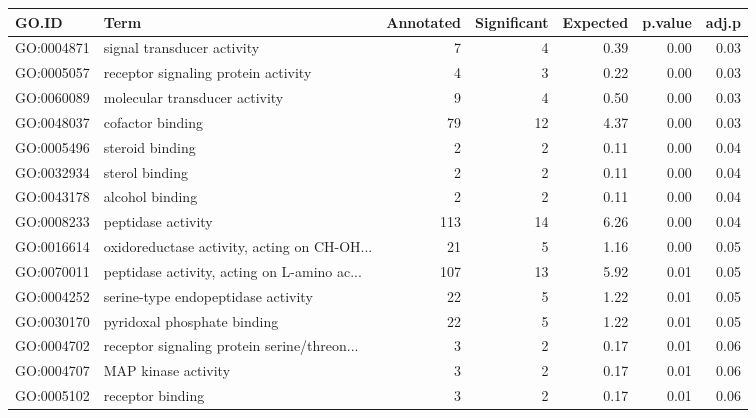 \begin{table}[ht]
\centering
\begin{tabular}{llrrrrr}
  \hline
GO.ID & Term & Annotated & Significant & Expected & p.value & adj.p \\ 
  \hline
GO:0004871 & signal transducer activity &   7 &   4 & 0.39 & 0.00 & 0.03 \\ 
  GO:0005057 & receptor signaling protein activity &   4 &   3 & 0.22 & 0.00 & 0.03 \\ 
  GO:0060089 & molecular transducer activity &   9 &   4 & 0.50 & 0.00 & 0.03 \\ 
  GO:0048037 & cofactor binding &  79 &  12 & 4.37 & 0.00 & 0.03 \\ 
  GO:0005496 & steroid binding &   2 &   2 & 0.11 & 0.00 & 0.04 \\ 
  GO:0032934 & sterol binding &   2 &   2 & 0.11 & 0.00 & 0.04 \\ 
  GO:0043178 & alcohol binding &   2 &   2 & 0.11 & 0.00 & 0.04 \\ 
  GO:0008233 & peptidase activity & 113 &  14 & 6.26 & 0.00 & 0.04 \\ 
  GO:0016614 & oxidoreductase activity, acting on CH-OH... &  21 &   5 & 1.16 & 0.00 & 0.05 \\ 
  GO:0070011 & peptidase activity, acting on L-amino ac... & 107 &  13 & 5.92 & 0.01 & 0.05 \\ 
  GO:0004252 & serine-type endopeptidase activity &  22 &   5 & 1.22 & 0.01 & 0.05 \\ 
  GO:0030170 & pyridoxal phosphate binding &  22 &   5 & 1.22 & 0.01 & 0.05 \\ 
  GO:0004702 & receptor signaling protein serine/threon... &   3 &   2 & 0.17 & 0.01 & 0.06 \\ 
  GO:0004707 & MAP kinase activity &   3 &   2 & 0.17 & 0.01 & 0.06 \\ 
  GO:0005102 & receptor binding &   3 &   2 & 0.17 & 0.01 & 0.06 \\ 
   \hline
\end{tabular}
\end{table}
